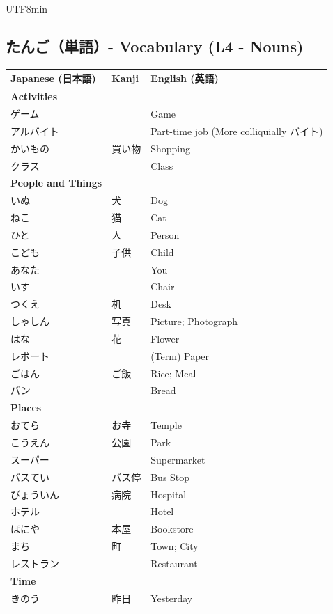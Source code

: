 \documentclass[11pt]{article}
\begin{document}
\begin{CJK}{UTF8}{min}
\newpage
\subsection{たんご（単語）- Vocabulary (L4 - Nouns)}
\begin{tabularx}{\linewidth}{X | X | X}
    \toprule
    \textbf{Japanese (日本語)} & \textbf{Kanji} & \textbf{English (英語)} \\
    \midrule
    \textbf{Activities} &  & \\
    ゲーム &  & Game \\
    アルバイト &  & Part-time job (More colliquially バイト) \\
    かいもの & 買い物 & Shopping \\
    クラス &  & Class \\
    \hline
    \textbf{People and Things} &  & \\
    いぬ & 犬 & Dog \\
    ねこ & 猫 & Cat \\
    ひと & 人 & Person \\
    こども & 子供 & Child \\
    あなた &  & You \\
    いす &  & Chair \\
    つくえ & 机 & Desk \\
    しゃしん & 写真 & Picture; Photograph \\
    はな & 花 & Flower \\
    レポート &  & (Term) Paper \\
    ごはん & ご飯 & Rice; Meal \\
    パン &  & Bread \\
    \hline
    \textbf{Places} &  & \\
    おてら & お寺 & Temple \\
    こうえん & 公園 & Park \\
    スーパー &  & Supermarket \\
    バスてい & バス停 & Bus Stop \\
    びょういん & 病院 & Hospital \\
    ホテル &  & Hotel \\
    ほにや & 本屋 & Bookstore \\
    まち & 町 & Town; City \\
    レストラン &  & Restaurant \\
    \hline
    \textbf{Time} &  & \\
    きのう & 昨日 & Yesterday \\

\end{tabularx}
\end{CJK}
\end{document}
